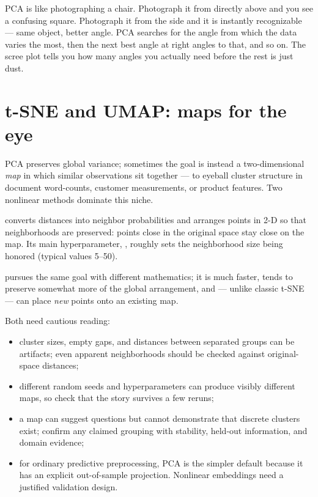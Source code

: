 \begin{analogy}
PCA is like photographing a chair. Photograph it from directly above and you see a confusing square. Photograph it from the side and it is instantly recognizable --- same object, better angle. PCA searches for the angle from which the data varies the most, then the next best angle at right angles to that, and so on. The scree plot tells you how many angles you actually need before the rest is just dust.
\end{analogy}

\section{t-SNE and UMAP: maps for the eye}
\label{sec:tsne-umap}

PCA preserves global variance; sometimes the goal is instead a two-dimensional \emph{map} in which similar observations sit together --- to eyeball cluster structure in document word-counts, customer measurements, or product features. Two nonlinear methods dominate this niche.

 converts distances into neighbor probabilities and arranges points in 2-D so that neighborhoods are preserved: points close in the original space stay close on the map. Its main hyperparameter, , roughly sets the neighborhood size being honored (typical values 5--50).

 pursues the same goal with different mathematics; it is much faster, tends to preserve somewhat more of the global arrangement, and --- unlike classic t-SNE --- can place \emph{new} points onto an existing map.

Both need cautious reading:

\begin{itemize}
  \item cluster sizes, empty gaps, and distances between separated groups can be artifacts; even apparent neighborhoods should be checked against original-space distances;
  \item different random seeds and hyperparameters can produce visibly different maps, so check that the story survives a few reruns;
  \item a map can suggest questions but cannot demonstrate that discrete clusters exist; confirm any claimed grouping with stability, held-out information, and domain evidence;
  \item for ordinary predictive preprocessing, PCA is the simpler default because it has an explicit out-of-sample projection. Nonlinear embeddings need a justified validation design.
\end{itemize}

